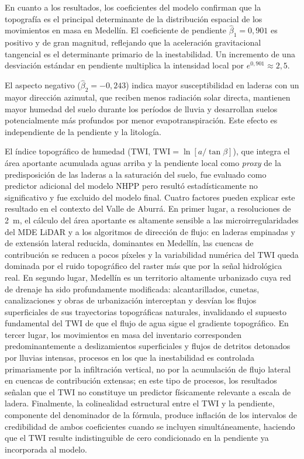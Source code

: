 \documentclass[12pt, a4paper]{article}
\begin{document}
En cuanto a los resultados, los coeficientes del modelo confirman que la topografía es el principal
determinante de la distribución espacial de los movimientos en masa en Medellín. El coeficiente de pendiente
$\hat{\beta}_1 = 0{,}901$ es positivo y de gran magnitud,
reflejando que la aceleración gravitacional tangencial es el determinante primario
de la inestabilidad. Un incremento de una desviación estándar en pendiente
multiplica la intensidad local por $e^{0{,}901} \approx 2{,}5$.

El aspecto negativo ($\hat{\beta}_2 = -0{,}243$) indica mayor susceptibilidad
en laderas con un mayor dirección azimutal, que reciben menos radiación solar directa,
mantienen mayor humedad del suelo durante los períodos de lluvia y desarrollan
suelos potencialmente más profundos por menor evapotranspiración. Este efecto es
independiente de la pendiente y la litología.

El índice topográfico de humedad (TWI, $\text{TWI} = \ln[a/\tan\beta]$), que integra
el área aportante acumulada aguas arriba y la pendiente local como \emph{proxy} de la
predisposición de las laderas a la saturación del suelo, fue evaluado como predictor
adicional del modelo NHPP pero resultó estadísticamente no significativo y fue excluido del modelo final. 
Cuatro factores pueden explicar este resultado en el contexto del Valle de Aburrá. En primer lugar,
a resoluciones de \SI{2}{m}, el cálculo del área aportante es altamente sensible a las
microirregularidades del MDE LiDAR y a los algoritmos de dirección de flujo: en laderas
empinadas y de extensión lateral reducida, dominantes en Medellín, las
cuencas de contribución se reducen a pocos píxeles y la variabilidad numérica del TWI
queda dominada por el ruido topográfico del raster más que por la señal hidrológica real.
En segundo lugar, Medellín es un territorio altamente urbanizado cuya red de
drenaje ha sido profundamente modificada: alcantarillados, cunetas, canalizaciones y obras
de urbanización interceptan y desvían los flujos superficiales de sus trayectorias
topográficas naturales, invalidando el supuesto fundamental del TWI de que el flujo de agua
sigue el gradiente topográfico. En tercer lugar, los movimientos en masa del inventario
corresponden predominantemente a deslizamientos superficiales y flujos de detritos detonados
por lluvias intensas, procesos en los que la inestabilidad es
controlada primariamente por la infiltración vertical, no por la acumulación de flujo lateral 
en cuencas de contribución extensas;
en este tipo de procesos, los resultados señalan que el TWI no constituye un predictor físicamente relevante a escala
de ladera. Finalmente, la colinealidad estructural entre el TWI y la pendiente, componente
del denominador de la fórmula, produce inflación de los intervalos de credibilidad de
ambos coeficientes cuando se incluyen simultáneamente, haciendo que el TWI resulte
indistinguible de cero condicionado en la pendiente ya incorporada al modelo.
\end{document}
